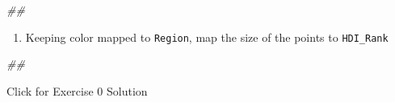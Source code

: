 \documentclass[
]{book}
\newenvironment{Shaded}{\begin{snugshade}}{\end{snugshade}}
\newcommand{\CommentTok}[1]{\textcolor[rgb]{0.56,0.35,0.01}{\textit{#1}}}
\providecommand{\tightlist}{%
  \setlength{\itemsep}{0pt}\setlength{\parskip}{0pt}}
\begin{document}
\begin{Shaded}
\begin{Highlighting}[]
\CommentTok{\#\# }
\end{Highlighting}
\end{Shaded}

\begin{enumerate}
\def\labelenumi{\arabic{enumi}.}
\setcounter{enumi}{4}
\tightlist
\item
  Keeping color mapped to \texttt{Region}, map the size of the points to \texttt{HDI\_Rank}
\end{enumerate}

\begin{Shaded}
\begin{Highlighting}[]
\CommentTok{\#\# }
\end{Highlighting}
\end{Shaded}

{Click for Exercise 0 Solution}
\end{document}
